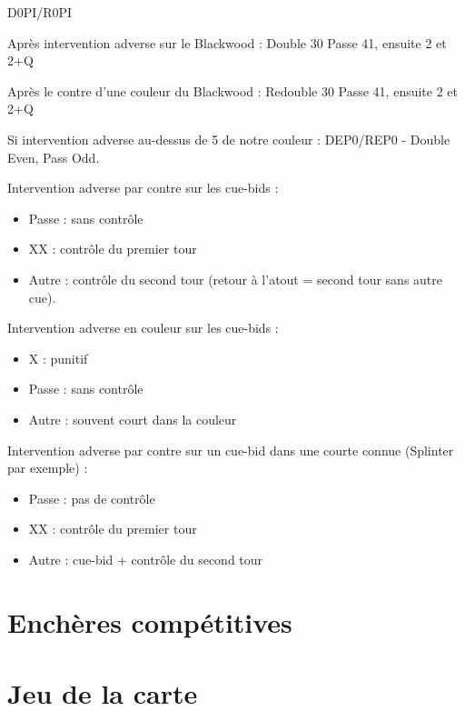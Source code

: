 \documentclass[a4paper]{article}
\begin{document}
D0PI/R0PI

Après intervention adverse sur le Blackwood :
Double 30 Passe 41, ensuite 2 et 2+Q

Après le contre d'une couleur du Blackwood :
Redouble 30 Passe 41, ensuite 2 et 2+Q

Si intervention adverse au-dessus de 5 de notre couleur :
DEP0/REP0 - Double Even, Pass Odd.

Intervention adverse par contre sur les cue-bids :

\begin{itemize}
\item Passe : sans contrôle

\item XX : contrôle du premier tour

\item Autre : contrôle du second tour (retour à l'atout = second tour sans autre cue).

\end{itemize}

Intervention adverse en couleur sur les cue-bids :

\begin{itemize}
\item X : punitif

\item Passe : sans contrôle

\item Autre : souvent court dans la couleur

\end{itemize}

Intervention adverse par contre sur un cue-bid dans une courte connue (Splinter par exemple) :

\begin{itemize}
\item Passe : pas de contrôle

\item XX : contrôle du premier tour

\item Autre : cue-bid + contrôle du second tour

\end{itemize}

\section{Enchères compétitives}

\section{Jeu de la carte}
\end{document}
